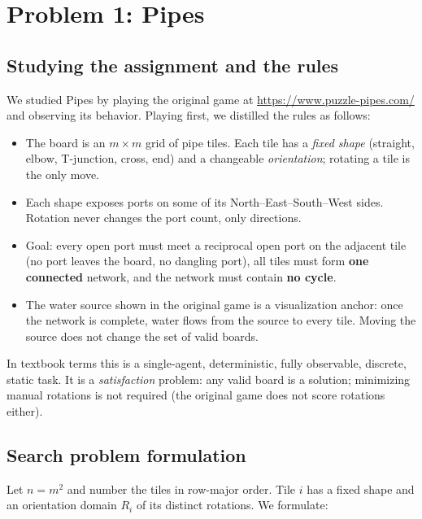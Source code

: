 \section{Problem 1: Pipes}

\subsection{Studying the assignment and the rules}

We studied Pipes by playing the original game at \url{https://www.puzzle-pipes.com/}
and observing its behavior. Playing first, we distilled the rules as follows:

\begin{itemize}
\item The board is an $m\times m$ grid of pipe tiles. Each tile has a \emph{fixed
shape} (straight, elbow, T-junction, cross, end) and a changeable \emph{orientation};
rotating a tile is the only move.
\item Each shape exposes ports on some of its North--East--South--West sides.
Rotation never changes the port count, only directions.
\item Goal: every open port must meet a reciprocal open port on the adjacent tile
(no port leaves the board, no dangling port), all tiles must form \textbf{one
connected} network, and the network must contain \textbf{no cycle}.
\item The water source shown in the original game is a visualization anchor: once
the network is complete, water flows from the source to every tile. Moving the
source does not change the set of valid boards.
\end{itemize}

In textbook terms this is a single-agent, deterministic, fully observable,
discrete, static task. It is a \emph{satisfaction} problem: any valid board is a
solution; minimizing manual rotations is not required (the original game does not
score rotations either).

\subsection{Search problem formulation}

Let $n=m^2$ and number the tiles in row-major order. Tile $i$ has a fixed shape
and an orientation domain $R_i$ of its distinct rotations. We formulate:

